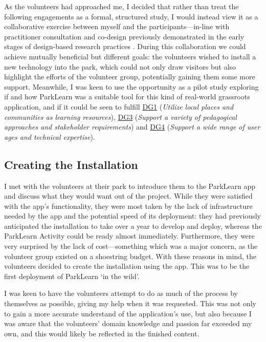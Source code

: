 As the volunteers had approached me, I decided that rather than treat the following engagements as a formal, structured study, I would instead view it as a collaborative exercise between myself and the participants---in-line with practitioner consultation and co-design previously demonstrated in the early stages of design-based research practices \citep{herrington2009}. During this collaboration we could achieve mutually beneficial but different goals: the volunteers wished to install a new technology into the park, which could not only draw visitors but also highlight the efforts of the volunteer group, potentially gaining them some more support. Meanwhile, I was keen to use the opportunity as a pilot study exploring if and how ParkLearn was a suitable tool for this kind of real-world grassroots application, and if it could be seen to fulfill \hyperref[DG1]{DG1} (\textit{Utilize local places and communities as learning resources}), \hyperref[DG3]{DG3} (\textit{Support a variety of pedagogical approaches and stakeholder requirements}) and \hyperref[DG4]{DG4} (\textit{Support a wide range of user ages and technical expertise}).

\subsection{Creating the Installation}

I met with the volunteers at their park to introduce them to the ParkLearn app and discuss what they would want out of the project. While they were satisfied with the app's functionality, they were most taken by the lack of infrastructure needed by the app and the potential speed of its deployment: they had previously anticipated the installation to take over a year to develop and deploy, whereas the ParkLearn Activity could be ready almost immediately. Furthermore, they were very surprised by the lack of cost---something which was a major concern, as the volunteer group existed on a shoestring budget. With these reasons in mind, the volunteers decided to create the installation using the app. This was to be the first deployment of ParkLearn `in the wild'.

I was keen to have the volunteers attempt to do as much of the process by themselves as possible, giving my help when it was requested. This was not only to gain a more accurate understand of the application's use, but also because I was aware that the volunteers' domain knowledge and passion far exceeded my own, and this would likely be reflected in the finished content.


